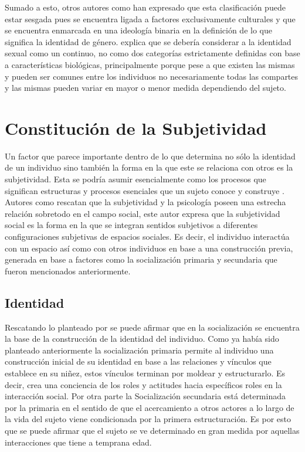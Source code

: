 Sumado a esto, otros autores como \textcite{Hernandez2010} han expresado que
esta clasificación puede estar sesgada pues se encuentra ligada a factores
exclusivamente culturales y que se encuentra enmarcada en una ideología binaria
en la definición de lo que significa la identidad de género.
\textcite{Vargas2017} explica que se debería considerar a la identidad sexual
como un continuo, no como dos categorías estrictamente definidas con base a
características biológicas, principalmente porque pese a que existen las mismas
y pueden ser comunes entre los individuos no necesariamente todas las compartes
y las mismas pueden variar en mayor o menor medida dependiendo del sujeto.

\section{Constitución de la Subjetividad}

Un factor que parece importante dentro de lo que determina no sólo la identidad
de un individuo sino también la forma en la que este se relaciona con otros es
la subjetividad. Esta se podría asumir
esencialmente como los procesos que significan estructuras y procesos esenciales
que un sujeto conoce y construye \parencite{Duesing2002}.  Autores como
 \textcite{Gonzalez2013}
rescatan que la subjetividad y la psicología poseen una estrecha relación
sobretodo en el campo social, este autor expresa que la subjetividad social es
la forma en la que se integran sentidos subjetivos a diferentes configuraciones
subjetivas de espacios sociales. Es decir, el individuo interactúa con un
espacio así como con otros individuos en base a una construcción previa,
generada en base a factores como la socialización primaria y secundaria que
fueron mencionados anteriormente.

\subsection{Identidad}

Rescatando lo planteado por \textcite{Berger1991} se puede afirmar que en la
socialización se encuentra la base de la construcción de la identidad del
individuo. Como ya había sido planteado anteriormente la socialización primaria
permite al individuo una construcción inicial de su identidad en base a las
relaciones y vínculos que establece en su niñez, estos vínculos terminan por
moldear y estructurarlo. Es decir, crea una conciencia de los roles y actitudes
hacia específicos roles en la interacción social. Por otra parte la
Socialización secundaria está determinada por la primaria en el sentido de que
el acercamiento a otros actores a lo largo de la vida del sujeto viene
condicionada por la primera estructuración. Es por esto que se puede afirmar que
el sujeto se ve determinado en gran medida por aquellas interacciones que tiene
a temprana edad.

